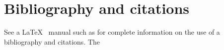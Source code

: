 %
%
%
%
%
%
%
%
%

\section{Bibliography and citations}
See a \LaTeX~ manual such as \cite{go-mi-sa:latex}
for complete information on the use of a bibliography and citations.  The 



